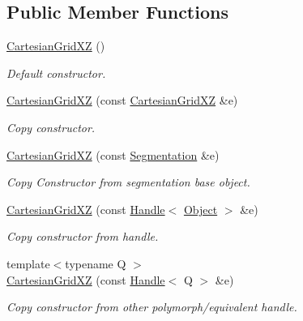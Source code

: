 \subsection*{Public Member Functions}
\begin{DoxyCompactItemize}
\item 
\hyperlink{class_d_d4hep_1_1_geometry_1_1_cartesian_grid_x_z_a91260b22b34fd4e9c8f1426e60eef7a5}{CartesianGridXZ} ()
\begin{DoxyCompactList}\small\item\em Default constructor. \item\end{DoxyCompactList}\item 
\hyperlink{class_d_d4hep_1_1_geometry_1_1_cartesian_grid_x_z_aff50e3bc7fdfd7ffc6a931a45f855f7d}{CartesianGridXZ} (const \hyperlink{class_d_d4hep_1_1_geometry_1_1_cartesian_grid_x_z}{CartesianGridXZ} \&e)
\begin{DoxyCompactList}\small\item\em Copy constructor. \item\end{DoxyCompactList}\item 
\hyperlink{class_d_d4hep_1_1_geometry_1_1_cartesian_grid_x_z_a9db23330d388e78285ae0c5597fc5617}{CartesianGridXZ} (const \hyperlink{class_d_d4hep_1_1_geometry_1_1_segmentation}{Segmentation} \&e)
\begin{DoxyCompactList}\small\item\em Copy Constructor from segmentation base object. \item\end{DoxyCompactList}\item 
\hyperlink{class_d_d4hep_1_1_geometry_1_1_cartesian_grid_x_z_a2ac7c5874abd765734541bd8adde8ca0}{CartesianGridXZ} (const \hyperlink{class_d_d4hep_1_1_handle}{Handle}$<$ \hyperlink{class_t}{Object} $>$ \&e)
\begin{DoxyCompactList}\small\item\em Copy constructor from handle. \item\end{DoxyCompactList}\item 
{\footnotesize template$<$typename Q $>$ }\\\hyperlink{class_d_d4hep_1_1_geometry_1_1_cartesian_grid_x_z_a3d8a2e58894df58701a8929fafa4fccf}{CartesianGridXZ} (const \hyperlink{class_d_d4hep_1_1_handle}{Handle}$<$ Q $>$ \&e)
\begin{DoxyCompactList}\small\item\em Copy constructor from other polymorph/equivalent handle. \item\end{DoxyCompactList}\item 

\end{DoxyCompactItemize}
